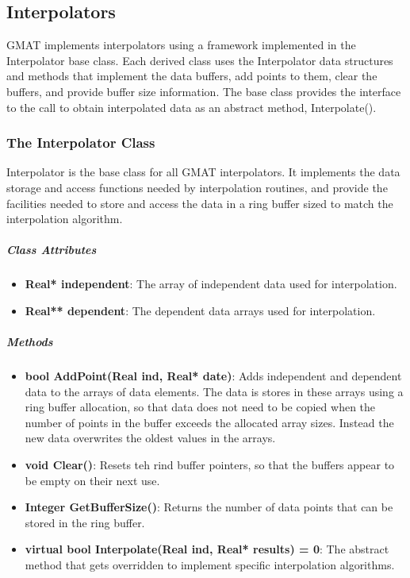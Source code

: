 \subsection{Interpolators}

GMAT implements interpolators using a framework implemented in the Interpolator base class.  Each
derived class uses the Interpolator data structures and methods that implement the data buffers,
add points to them, clear the buffers, and provide buffer size information.  The base class
provides the interface to the call to obtain interpolated data as an abstract method, Interpolate().

\subsubsection{The Interpolator Class}

Interpolator is the base class for all GMAT interpolators.  It implements the data storage and
access functions needed by interpolation routines, and provide the facilities needed to store and
access the data in a ring buffer sized to match the interpolation algorithm.

\subparagraph{Class Attributes}

\begin{itemize}
\item \textbf{Real* independent}: The array of independent data used for interpolation.
\item \textbf{Real** dependent}: The dependent data arrays used for interpolation.
\end{itemize}

\subparagraph{Methods}

\begin{itemize}
\item \textbf{bool AddPoint(Real ind, Real* date)}: Adds independent and dependent data to the
arrays of data elements.  The data is stores in these arrays using a ring buffer allocation, so
that data does not need to be copied when the number of points in the buffer exceeds the allocated
array sizes.  Instead the new data overwrites the oldest values in the arrays.
\item \textbf{void Clear()}:  Resets teh rind buffer pointers, so that the buffers appear to be
empty on their next use.
\item \textbf{Integer GetBufferSize()}:  Returns the number of data points that can be stored in
the ring buffer.
\item \textbf{virtual bool Interpolate(Real ind, Real* results) = 0}: The abstract method that gets
overridden to implement specific interpolation algorithms.
\end{itemize}


